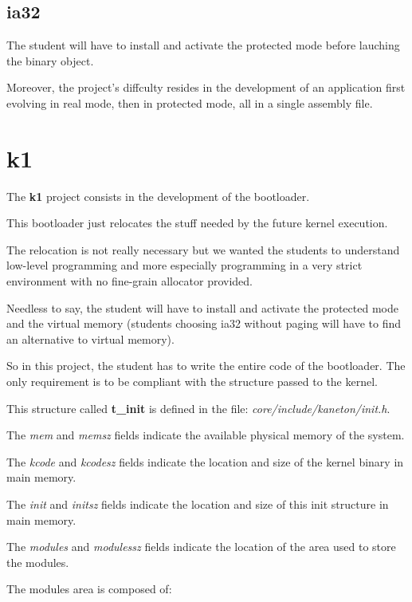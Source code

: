%
%

\subsection{ia32}

The student will have to install and activate the protected mode before
lauching the binary object.

Moreover, the project's diffculty resides in the development of an
application first evolving in real mode, then in protected mode, all
in a single assembly file.

%
%

\section{k1}

The \textbf{k1} project consists in the development of the bootloader.

This bootloader just relocates the stuff needed by the future kernel
execution.

The relocation is not really necessary but we wanted the students
to understand low-level programming and more especially programming
in a very strict environment with no fine-grain allocator provided.

Needless to  say, the  student will have  to install and  activate the
protected mode and the  virtual memory (students choosing ia32 without
paging will have to find an alternative to virtual memory).

So in this project, the student has to write the entire code of the
bootloader. The only requirement is to be compliant with the structure
passed to the kernel.

This structure called \textbf{t\_init} is defined in the
file: \textit{core/include/kaneton/init.h}.

The \textit{mem} and \textit{memsz} fields indicate the available physical
memory of the system.

The \textit{kcode} and \textit{kcodesz} fields indicate the location and
size of the kernel binary in main memory.

The \textit{init} and \textit{initsz} fields indicate the location and
size of this init structure in main memory.

The \textit{modules} and \textit{modulessz} fields indicate the
location of the area used to store the modules.

The modules area is composed of:

